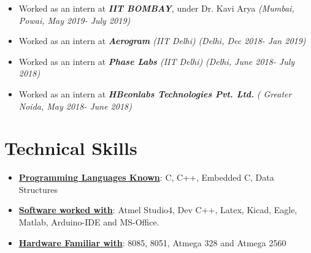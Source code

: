 \documentclass[10pt,a4paper,sans]{moderncv} %
\begin{document}
\begin{itemize}

\item Worked as an intern at\textit{\textbf{ IIT BOMBAY}}, under  Dr. Kavi Arya  \textit{ (Mumbai, Powai,  May 2019- July 2019) } \newline

\item Worked as an intern at\textit{\textbf{ Aerogram} (IIT Delhi)} \textit{ (Delhi, Dec 2018- Jan 2019) } \newline

\item Worked as an intern at\textit{\textbf{ Phase Labs }(IIT Delhi)} \textit{ (Delhi, June 2018- July 2018) } \newline

\item Worked as an intern at\textit{\textbf{ HBeonlabs Technologies Pvt. Ltd.}} \textit{( Greater Noida, May 2018- June 2018) } \newline


\end{itemize}




\section{Technical Skills}

\begin{itemize}
\item\textbf{\underline{Programming Languages Known}}: C, C++, Embedded C, Data Structures \newline

\item \textbf{\underline{Software worked with}}:  Atmel Studio4, Dev C++,  Latex, Kicad, Eagle, Matlab, Arduino-IDE and MS-Office.  \newline

\item \textbf{\underline{Hardware Familiar with}}: 8085, 8051, Atmega 328 and Atmega 2560 

\end {itemize}


\end{document}
